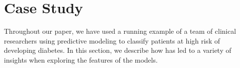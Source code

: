 
\section{Case Study}
Throughout our paper, we have used a running example of a team
of clinical researchers using predictive modeling to
classify patients at high risk of developing diabetes.
In this section, we describe how \infuse has led to a variety
of insights when exploring the features of the models.

\begin{figure}
\centering
{}
\end{figure}
